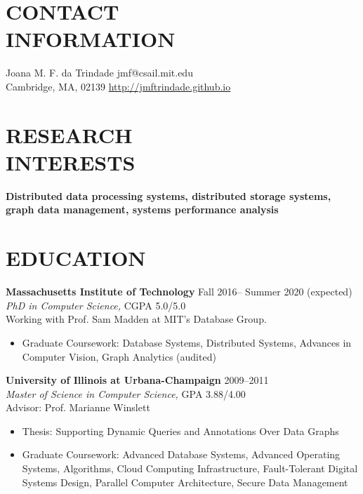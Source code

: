\documentclass[line,margin]{res}
\begin{document}
 
\begin{resume}
 
\section{CONTACT \\ INFORMATION}  Joana M. F. da Trindade \hfill jmf@csail.mit.edu \\
               Cambridge, MA, 02139 \hfill \url{http://jmftrindade.github.io}
               


\section{RESEARCH \\ INTERESTS}       \textbf{Distributed data processing systems, distributed storage systems, graph data management, systems performance analysis}
 
\section{EDUCATION} \textbf{Massachusetts Institute of Technology} \hfill Fall 2016-- Summer 2020 (expected) \\
                {\sl PhD in Computer Science,} CGPA 5.0/5.0 \\
                Working with Prof. Sam Madden at MIT's Database Group.
                \begin{itemize}  \itemsep -2pt
                    \item Graduate Coursework: Database Systems, Distributed Systems, Advances in Computer Vision, Graph Analytics (audited)
                \end{itemize}

                \textbf{University of Illinois at Urbana-Champaign} \hfill 2009--2011 \\
                {\sl Master of Science in Computer Science,}  GPA 3.88/4.00 \\
                Advisor: Prof. Marianne Winslett
                \begin{itemize}  \itemsep -2pt
                \item  Thesis: Supporting Dynamic Queries and Annotations Over Data Graphs
                \item Graduate Coursework: Advanced Database Systems, Advanced Operating Systems, Algorithms, Cloud Computing Infrastructure, Fault-Tolerant Digital Systems Design, Parallel Computer Architecture, Secure Data Management
                \end{itemize}
                

\end{resume}
\end{document}
